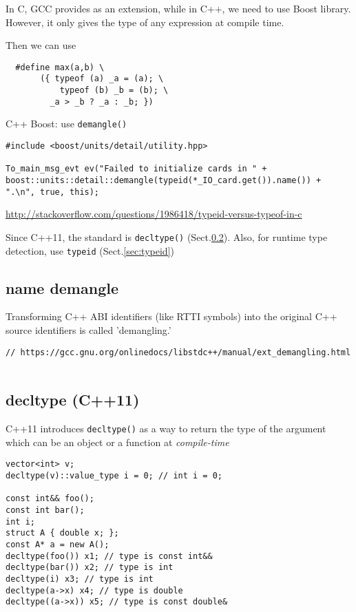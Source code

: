In C, GCC provides as an extension, while in C++, we need to use Boost library. 
However, it only gives the type of any expression at compile time.

Then we can use
\begin{lstlisting}
  #define max(a,b) \
       ({ typeof (a) _a = (a); \
           typeof (b) _b = (b); \
         _a > _b ? _a : _b; })
\end{lstlisting}

C++ Boost: use \verb!demangle()!
\begin{lstlisting}
#include <boost/units/detail/utility.hpp>

To_main_msg_evt ev("Failed to initialize cards in " + boost::units::detail::demangle(typeid(*_IO_card.get()).name()) + ".\n", true, this);
\end{lstlisting}
\url{http://stackoverflow.com/questions/1986418/typeid-versus-typeof-in-c}

Since C++11, the standard is \verb!decltype()! (Sect.\ref{sec:decltype}).
Also, for runtime type detection, use \verb!typeid! (Sect.\ref{sec:typeid})

\subsection{name demangle}
\label{sec:name_mangling}

Transforming C++ ABI identifiers (like RTTI symbols) into the original C++
source identifiers is called 'demangling.'

\begin{lstlisting}
// https://gcc.gnu.org/onlinedocs/libstdc++/manual/ext_demangling.html


\end{lstlisting}


\subsection{decltype (C++11)}
\label{sec:decltype}

C++11 introduces \verb!decltype()! as a way to return the type of the argument
which can be an object or a function at {\it compile-time} 

\begin{lstlisting}
vector<int> v;
decltype(v)::value_type i = 0; // int i = 0;

const int&& foo();
const int bar();
int i;
struct A { double x; };
const A* a = new A();
decltype(foo()) x1; // type is const int&&
decltype(bar()) x2; // type is int
decltype(i) x3; // type is int
decltype(a->x) x4; // type is double
decltype((a->x)) x5; // type is const double&
\end{lstlisting} 

